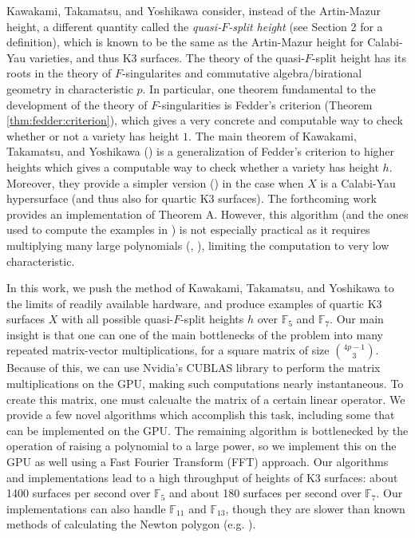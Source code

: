 Kawakami, Takamatsu, and Yoshikawa consider, 
instead of the Artin-Mazur height, a different quantity called the
\textit{quasi-\(F\)-split height} 
(see Section 2 for a definition),
which is known to be the same as the Artin-Mazur height
for Calabi-Yau varieties, and thus K3 surfaces.
The theory of the quasi-\(F\)-split height has its
roots in the theory of \(F\)-singularites and commutative
algebra/birational geometry in characteristic \(p\).
In particular, one theorem fundamental
to the development of the theory of \(F\)-singularities
is Fedder's criterion (Theorem \ref{thm:fedder:criterion}), 
which gives a very concrete and computable way to check
whether or not a variety has height \(1\).
The main theorem of Kawakami, Takamatsu, and Yoshikawa
(\cite[Theorem~A]{kty-2022-fedder})
is a generalization of Fedder's criterion
to higher heights which gives a 
computable way to check whether a variety has height \(h\).
Moreover, they provide a simpler version
(\cite[Theorem~C]{kty-2022-fedder})
in the case when \(X\) is a Calabi-Yau hypersurface
(and thus also for quartic K3 surfaces).
The forthcoming work 
\cite{fgmq-2025-witt-vectors-macaulay2} 
provides an implementation of Theorem A.
However, this algorithm (and the ones used to compute
the examples
in \cite{kty-2022-fedder}) is not especially practical
as it requires multiplying many large polynomials
(\cite{takamatsu-2024-algorithm}, 
\cite{fgmq-2025-witt-vectors-macaulay2}),
limiting the computation to
very low characteristic.

In this work, we push the method of Kawakami,
Takamatsu, and Yoshikawa to the limits of readily
available hardware, 
and produce examples of quartic K3 surfaces \(X\) with all
possible quasi-\(F\)-split heights \(h\) 
over \(\mathbb{F}_{5}\) and \(\mathbb{F}_{7}\).
Our main insight is that one can one of the main
bottlenecks of the problem into many repeated matrix-vector
multiplications, for a square matrix of size 
\(\binom{4p-1}{3}\).
Because of this, we can use Nvidia's CUBLAS library 
\cite{nvidia-2024-cublas}
to perform the matrix multiplications
on the GPU, making such computations
nearly instantaneous.
To create this matrix, one must calcualte the matrix of a
certain linear operator.
We provide a few novel algorithms which accomplish this task,
including some that can be implemented on the GPU.
The remaining algorithm is bottlenecked by the operation
of raising a polynomial to a large power, 
so we implement this on the GPU as well using 
a Fast Fourier Transform (FFT) approach.
Our algorithms and implementations lead to a high throughput
of heights of K3 surfaces: 
about 1400 surfaces per second over \(\mathbb{F}_{5}\) and
about 180 surfaces per second over \(\mathbb{F}_{7}\).
Our implementations can also handle \(\mathbb{F}_{11}\) 
and \(\mathbb{F}_{13}\), though they are slower than known methods
of calculating the Newton polygon (e.g. 
\cite{chk-2019-toric-controlled-reduction}).

